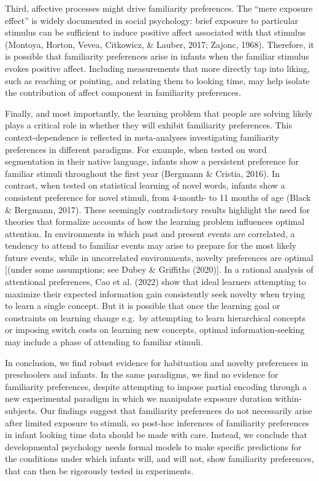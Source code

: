 \documentclass[10pt, letterpaper]{article}
\begin{document}
Third, affective processes might drive familiarity preferences. The
``mere exposure effect'' is widely documented in social psychology:
brief exposure to particular stimulus can be sufficient to induce
positive affect associated with that stimulus (Montoya, Horton, Vevea,
Citkowicz, \& Lauber, 2017; Zajonc, 1968). Therefore, it is possible
that familiarity preferences arise in infants when the familiar stimulus
evokes positive affect. Including measurements that more directly tap
into liking, such as reaching or pointing, and relating them to looking
time, may help isolate the contribution of affect component in
familiarity preferences.

Finally, and most importantly, the learning problem that people are
solving likely plays a critical role in whether they will exhibit
familiarity preferences. This context-dependence is reflected in
meta-analyses investigating familiarity preferences in different
paradigms. For example, when tested on word segmentation in their native
language, infants show a persistent preference for familiar stimuli
throughout the first year (Bergmann \& Cristia, 2016). In contrast, when
tested on statistical learning of novel words, infants show a consistent
preference for novel stimuli, from 4-month- to 11 months of age (Black
\& Bergmann, 2017). These seemingly contradictory results highlight the
need for theories that formalize accounts of how the learning problem
influences optimal attention. In environments in which past and present
events are correlated, a tendency to attend to familiar events may arise
to prepare for the most likely future events, while in uncorrelated
environments, novelty preferences are optimal {[}(under some
assumptions; see Dubey \& Griffiths (2020){]}. In a rational analysis of
attentional preferences, Cao et al. (2022) show that ideal learners
attempting to maximize their expected information gain consistently seek
novelty when trying to learn a single concept. But it is possible that
once the learning goal or constraints on learning change e.g.~by
attempting to learn hierarchical concepts or imposing switch costs on
learning new concepts, optimal information-seeking may include a phase
of attending to familiar stimuli.

In conclusion, we find robust evidence for habituation and novelty
preferences in preschoolers and infants. In the same paradigms, we find
no evidence for familiarity preferences, despite attempting to impose
partial encoding through a new experimental paradigm in which we
manipulate exposure duration within-subjects. Our findings suggest that
familiarity preferences do not necessarily arise after limited exposure
to stimuli, so post-hoc inferences of familiarity preferences in infant
looking time data should be made with care. Instead, we conclude that
developmental psychology needs formal models to make specific
predictions for the conditions under which infants will, and will not,
show familiarity preferences, that can then be rigorously tested in
experiments.
\end{document}
